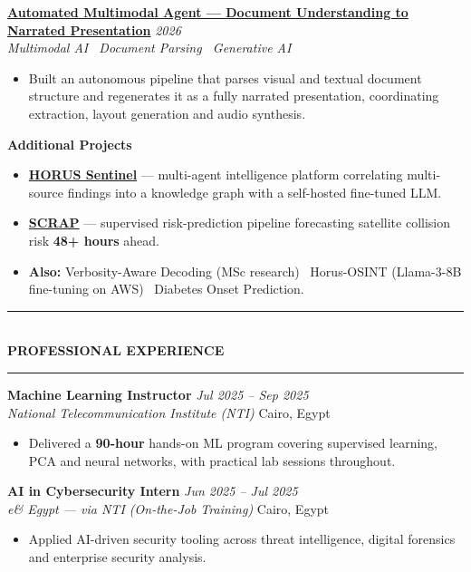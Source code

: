 \documentclass[10pt, a4paper]{article}
\newcommand{\cvsection}[1]{%
  \vspace{3pt}%
  {\color{navy}\rule{\linewidth}{1.1pt}}\\[0.5pt]%
  {\color{navy}\bfseries\fontsize{9.5}{11}\selectfont\uppercase{#1}}\\[-4pt]%
  {\color{teal}\rule{\linewidth}{0.6pt}}%
  \vspace{2pt}%
}
\newcommand{\cventry}[4]{%
  \vspace{2.5pt}%
  \textbf{\color{darkgray}#1} \hfill {\color{midgray}\textit{#3}}\\[-1.5pt]%
  {\color{teal}\textit{#2}} \hfill {\color{midgray}#4}%
}
\newcommand{\cvproject}[3]{%
  \vspace{2.5pt}%
  {\bfseries\color{navy}#1} \hfill {\color{midgray}\textit{#3}}\\[-1.5pt]%
  {\color{teal}\textit{#2}}%
}
\newcommand{\cvmini}[2]{\item {\bfseries\color{navy}#1} --- #2}
\newenvironment{cvitems}{%
  \begin{itemize}[leftmargin=11pt, itemsep=0.5pt, parsep=0pt, topsep=1pt,
                  label={\textcolor{teal}{$\bullet$}}]
}{%
  \end{itemize}%
}
\begin{document}
\cvproject{\href{https://github.com/MahmoudAlyosify/Automated-Multimodal-Agent-PDF-to-Narrated-PowerPoint}{Automated Multimodal Agent --- Document Understanding to Narrated Presentation}}
          {Multimodal AI \textperiodcentered\ Document Parsing \textperiodcentered\ Generative AI}
          {2026}
\begin{cvitems}
  \item Built an autonomous pipeline that parses visual and textual document structure and regenerates it as a fully narrated presentation, coordinating extraction, layout generation and audio synthesis.
\end{cvitems}

\vspace{3pt}
{\bfseries\color{navy}Additional Projects}
\begin{cvitems}
  \cvmini{\href{https://github.com/MahmoudAlyosify/horus-sentinel}{HORUS Sentinel}}{multi-agent intelligence platform correlating multi-source findings into a knowledge graph with a self-hosted fine-tuned LLM.}
  \cvmini{\href{https://github.com/MahmoudAlyosify/SCRAP-Satellite-Collision-Risk-Assessment-and-Prediction}{SCRAP}}{supervised risk-prediction pipeline forecasting satellite collision risk \textbf{48+ hours} ahead.}
  \item \textbf{Also:} Verbosity-Aware Decoding (MSc research) \textperiodcentered\ Horus-OSINT (Llama-3-8B fine-tuning on AWS) \textperiodcentered\ Diabetes Onset Prediction.
\end{cvitems}

\cvsection{Professional Experience}

\cventry{Machine Learning Instructor}{National Telecommunication Institute (NTI)}
        {Jul 2025 -- Sep 2025}{Cairo, Egypt}
\begin{cvitems}
  \item Delivered a \textbf{90-hour} hands-on ML program covering supervised learning, PCA and neural networks, with practical lab sessions throughout.
\end{cvitems}

\cventry{AI in Cybersecurity Intern}{e\& Egypt --- via NTI (On-the-Job Training)}
        {Jun 2025 -- Jul 2025}{Cairo, Egypt}
\begin{cvitems}
  \item Applied AI-driven security tooling across threat intelligence, digital forensics and enterprise security analysis.
\end{cvitems}
\end{document}
